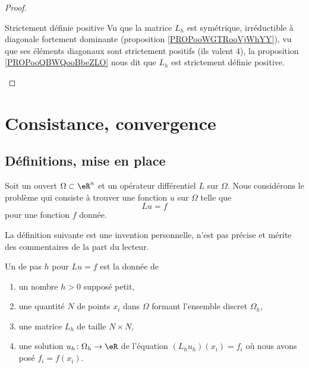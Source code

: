 \begin{proof}
\begin{subproof}
\item[Strictement définie positive]
    Vu que la matrice \( L_h\) est symétrique, irréductible à diagonale fortement dominante (proposition \ref{PROPooWGTRooVjWhYY}), vu que ses éléments diagonaux sont strictement positifs (ils valent \( 4\)), la proposition \ref{PROPooQBWQooBbeZLO} nous dit que \( L_h\) est strictement définie positive.

    \end{subproof}
\end{proof}

\section{Consistance, convergence}

\subsection{Définitions, mise en place}

Soit un ouvert \( \Omega\subset \eR^n\) et un opérateur différentiel \( L\) sur \( \Omega\). Nous considérons le problème qui consiste à trouver une fonction \( u\) sur \( \Omega\) telle que
\begin{equation}
    Lu=f
\end{equation}
pour une fonction \( f\) donnée.

\begin{probleme}
    La définition suivante est une invention personnelle, n'est pas précise et mérite des commentaires de la part du lecteur.
\end{probleme}
\begin{definition}
    Un  de pas \( h\) pour \( Lu=f\) est la donnée de
    \begin{enumerate}
        \item
            un nombre \( h>0\) supposé petit,
        \item
            une quantité \( N\) de points \( x_i \) dans \( \Omega\) formant l'ensemble discret \( \Omega_h\),
        \item
            une matrice \( L_h\) de taille \( N\times N\),
        \item
            une solution \( u_h\colon \Omega_h\to \eR\) de l'équation \( (L_hu_h)(x_i)=f_i\) où nous avons posé \( f_i=f(x_i)\).
    \end{enumerate}
\end{definition}

